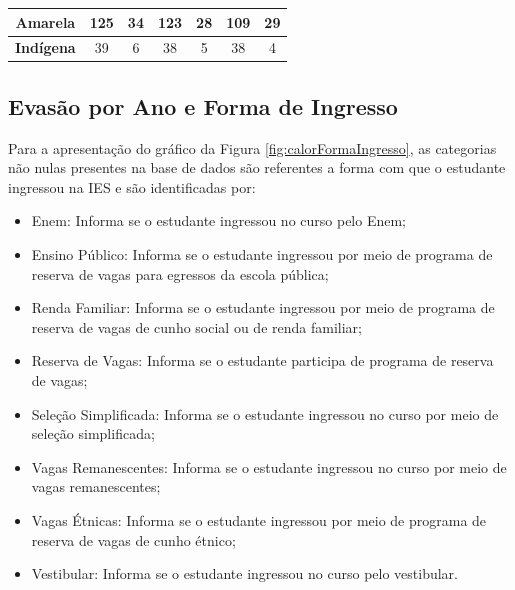 \begin{table}[H]
{\begin{tabular}{c|cc|cc|cc|}
\multicolumn{1}{|c|}{\cellcolor[HTML]{C0C0C0}\textbf{Amarela}}           & \multicolumn{1}{c|}{125}                                     & 34                                        & \multicolumn{1}{c|}{123}                                     & 28                                        & \multicolumn{1}{c|}{109}                                     & 29                                        \\ \hline
\multicolumn{1}{|c|}{\cellcolor[HTML]{C0C0C0}\textbf{Indígena}}          & \multicolumn{1}{c|}{39}                                      & 6                                         & \multicolumn{1}{c|}{38}                                      & 5                                         & \multicolumn{1}{c|}{38}                                      & 4                                         \\ \hline
\end{tabular}%
}
\end{table}


\subsection{Evasão por Ano e Forma de Ingresso}\label{sub:calorFomaIngresso}

Para a apresentação do gráfico da Figura \ref{fig:calorFormaIngresso}, as categorias não nulas presentes na base de dados são referentes a forma com que o estudante ingressou na IES e são identificadas por:
\begin{itemize}
    \item Enem: Informa se o estudante ingressou no curso pelo Enem;
    \item Ensino Público:  Informa se o estudante ingressou por meio de programa de reserva de vagas para egressos da escola pública;
    \item Renda Familiar: Informa se o estudante ingressou por meio de programa de reserva de vagas de cunho social ou de renda familiar;
    \item Reserva de Vagas: Informa se o estudante participa de programa de reserva de vagas;
    \item Seleção Simplificada: Informa se o estudante ingressou no curso por meio de seleção simplificada;
    \item Vagas Remanescentes: Informa se o estudante ingressou no curso por meio de vagas remanescentes;
    \item Vagas Étnicas: Informa se o estudante ingressou por meio de programa de reserva de vagas de cunho étnico;
    \item Vestibular: Informa se o estudante ingressou no curso pelo vestibular.
\end{itemize}

